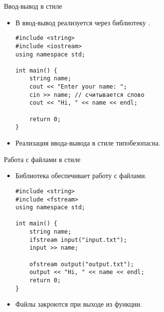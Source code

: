 \documentclass{beamer}
\begin{document}
\begin{frame}[fragile]{Ввод-вывод в стиле \langcpp}
\begin{itemize}    
    \item В \langcpp ввод-вывод реализуется через библиотеку .
    \begin{lstlisting}
#include <string>
#include <iostream>
using namespace std;

int main() {
    string name;
    cout << "Enter your name: ";
    cin >> name; // считывается слово
    cout << "Hi, " << name << endl;

    return 0;
}
    \end{lstlisting}
    \item Реализация ввода-вывода в стиле \langcpp типобезопасна.
\end{itemize}
\end{frame}

\begin{frame}[fragile]{Работа с файлами в стиле \langcpp}
\begin{itemize}    
    \small
    \item Библиотека  обеспечивает работу с файлами.
    \begin{lstlisting}
#include <string>
#include <fstream>
using namespace std;

int main() {
    string name;
    ifstream input("input.txt");
    input >> name;

    ofstream output("output.txt");
    output << "Hi, " << name << endl;
    return 0;
}
    \end{lstlisting}
    \item Файлы закроются при выходе из функции.
\end{itemize}
\end{frame}
\end{document}
